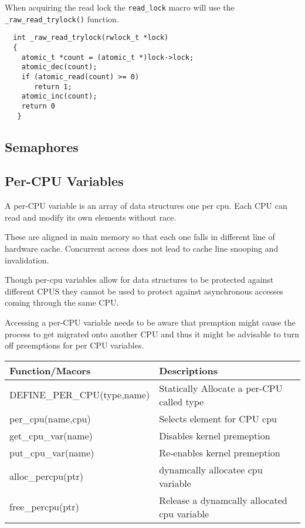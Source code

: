 \documentclass{article}
\begin{document}
When acquiring the read lock the \lstinline{read_lock} macro will use
the \lstinline{_raw_read_trylock()} function.

\begin{lstlisting}
  int _raw_read_trylock(rwlock_t *lock)
  {
    atomic_t *count = (atomic_t *)lock->lock;
    atomic_dec(count);
    if (atomic_read(count) >= 0)
       return 1;
    atomic_inc(count);
    return 0
   }
\end{lstlisting}



\subsection{Semaphores}



\subsection{Per-CPU Variables}

A per-CPU variable is an array of data structures one per cpu. Each CPU
can read and modify its own elements without race.

These are aligned in main memory so that each one falls in different
line of hardware cache. Concurrent access does not lead to cache line
snooping and invalidation.

Though per-cpu variables allow for data structures to be protected
against different CPUS they cannot be used to protect against
asynchronous accesses coming through the same CPU.

Accessing a per-CPU variable needs to be aware that premption might
cause the process to get migrated onto another CPU and thus it might
be advisable to turn off preemptions for per CPU variables.


\begin{center}
  \begin{tabular}{ l | l }
    
    \hline
    Function/Macors & Descriptions \\ \hline
    DEFINE\_PER\_CPU(type,name) & Statically Allocate a per-CPU called type \\ 
    per\_cpu(name,cpu) & Selects element for CPU cpu \\ 
    get\_cpu\_var(name) &  Disables kernel premeption \\
    put\_cpu\_var(name) &  Re-enables kernel premeption \\
    alloc\_percpu(ptr) &  dynamcally allocatee cpu variable \\
    free\_percpu(ptr) &  Release a dynamcally allocated cpu variable \\
    \hline
  \end{tabular}
\end{center}
\end{document}
